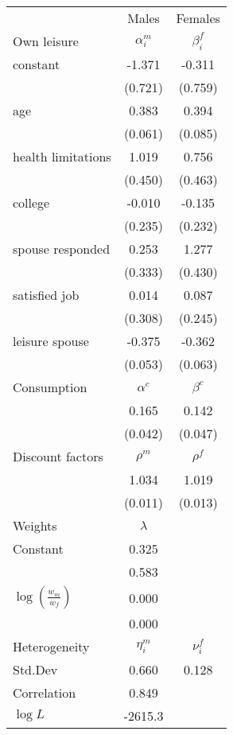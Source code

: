 \begin{tabular}{lcc} 
\hline\hline 
 & Males & Females \\ 
Own leisure & $\alpha_{i}^{m}$ & $\beta_{i}^{f}$ \\ 
constant & -1.371 & -0.311 \\ 
 & (0.721) & (0.759) \\ 
age & 0.383 & 0.394 \\ 
 & (0.061) & (0.085) \\ 
health limitations & 1.019 & 0.756 \\ 
 & (0.450) & (0.463) \\ 
college & -0.010 & -0.135 \\ 
 & (0.235) & (0.232) \\ 
spouse responded & 0.253 & 1.277 \\ 
 & (0.333) & (0.430) \\ 
satisfied job & 0.014 & 0.087 \\ 
 & (0.308) & (0.245) \\ 
leisure spouse & -0.375 & -0.362 \\ 
 & (0.053) & (0.063) \\ 
Consumption & $\alpha^{c}$ & $\beta^{c}$ \\ 
 & 0.165 & 0.142 \\ 
 & (0.042) & (0.047) \\ 
Discount factors & $\rho^m$ & $\rho^f$ \\ 
 & 1.034 & 1.019 \\ 
 & (0.011) & (0.013) \\ 
Weights & $\lambda$ &  \\ 
Constant & 0.325 &  \\ 
 & 0.583 &  \\ 
$\log(\frac{w_m}{w_f})$ & 0.000 &  \\ 
 & 0.000 &  \\ 
Heterogeneity & $\eta_i^m$ & $\nu_i^f$ \\ 
Std.Dev & 0.660 & 0.128 \\ 
Correlation & 0.849 &  \\ 
\hline 
$\log L$ & -2615.3 & \\ 
\hline \hline 
\end{tabular} 
